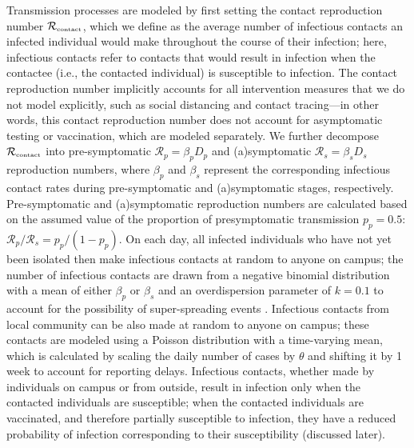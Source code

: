 \documentclass[12pt]{article}
\newcommand{\Rx}[1]{\ensuremath{{\mathcal R}_{#1}}}
\newcommand{\Rc}{\Rx{\textrm{\tiny{contact}}}}
\begin{document}
Transmission processes are modeled by first setting the contact reproduction number $\Rc$, which we define as the average number of infectious contacts an infected individual would make throughout the course of their infection;
here, infectious contacts refer to contacts that would result in infection when the contactee (i.e., the contacted individual) is susceptible to infection.
The contact reproduction number implicitly accounts for all intervention measures that we do not model explicitly, such as social distancing and contact tracing---in other words, this contact reproduction number does not account for asymptomatic testing or vaccination, which are modeled separately.
We further decompose $\Rc$ into pre-symptomatic $\mathcal R_p = \beta_p D_p$ and (a)symptomatic $\mathcal R_s = \beta_s D_s$ reproduction numbers, where $\beta_p$ and $\beta_s$ represent the corresponding infectious contact rates during pre-symptomatic and (a)symptomatic stages, respectively. Pre-symptomatic and (a)symptomatic reproduction numbers are calculated based on the assumed value of the proportion of presymptomatic transmission $p_p = 0.5$: $\mathcal R_p/\mathcal R_s = p_p/(1 - p_p)$.
On each day, all infected individuals who have not yet been isolated then make infectious contacts at random to anyone on campus; the number of infectious contacts are drawn from a negative binomial distribution with a mean of either $\beta_p$ or $\beta_s$ and an overdispersion parameter of $k=0.1$ to account for the possibility of super-spreading events \citep{10.12688/wellcomeopenres.15842.3}.
Infectious contacts from local community can be also made at random to anyone on campus; these contacts are modeled using a Poisson distribution with a time-varying mean, which is calculated by scaling the daily number of cases by $\theta$ and shifting it by 1 week to account for reporting delays.
Infectious contacts, whether made by individuals on campus or from outside, result in infection only when the contacted individuals are susceptible; when the contacted individuals are vaccinated, and therefore partially susceptible to infection, they have a reduced probability of infection corresponding to their susceptibility (discussed later).
\end{document}
